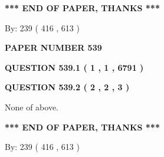\documentclass[12pt]{article}
\begin{document}
 
 
 
   
   
 \vspace{0.2in}
 
   
   
   
   
\vspace{1.0in} 
{\textbf{\large{ *** END OF PAPER, THANKS *** }}} 
   
   
\hspace{1.0in} By: 
 239 ( 416 ,  613 )
   
   
   
   
\newpage 
\setcounter{page}{ 
   539001 } 
   
   
   
   
 {\textbf{ \Large{ PAPER NUMBER  539  }}}
   
   
\vspace{0.2in}
   
   
   
   
   
   
 \vspace{0.2in}
 
 
 
 
   
   
  
\vspace{0.2in}
  
{\textbf{\Large{QUESTION
539.1 
 ( 1 , 1 , 6791 )
}}}
  
  
  
\vspace{0.2in}
  
{\textbf{\Large{QUESTION
539.2 
 ( 2 , 2 , 3 )
}}}
  
  
 
 
\noindent{}
 
 
 None of above.
 
 
 
 
   
   
 \vspace{0.2in}
 
   
   
   
   
\vspace{1.0in} 
{\textbf{\large{ *** END OF PAPER, THANKS *** }}} 
   
   
\hspace{1.0in} By: 
 239 ( 416 ,  613 )
   
\end{document}
